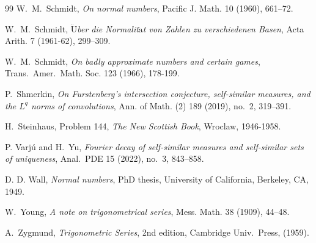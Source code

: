\documentclass[12pt, twoside]{article}
\theoremstyle{definition}
\numberwithin{equation}{section}
\begin{document}
\begin{thebibliography}{99}
W.~M.~Schmidt, 
{\em{On normal numbers}},
Pacific J. Math. 10 (1960), 661--72.

W.~M.~Schmidt, 
{\em{$\ddot{\text{U}}$ber die Normalit$\ddot{\text{a}}$t von Zahlen zu verschiedenen Basen}},
Acta Arith. 7 (1961-62), 299--309.

W.~M.~Schmidt,
{\em{On badly approximate numbers and certain games}}, Trans.~Amer.~Math. Soc. 123 (1966), 178-199. 

P.~Shmerkin,
{\em{On Furstenberg's intersection conjecture, self-similar measures, and the $L^q$ norms of convolutions}}, 
Ann. of Math. (2) 189 (2019), no.~2, 319--391.

H.~Steinhaus, Problem 144, 
{\em{The New Scottish Book}}, Wroclaw, 1946-1958.  

P. Varj\'u and H.~Yu, 
{\em{Fourier decay of self-similar measures and self-similar sets of uniqueness}}, 
Anal.~PDE 15 (2022), no.~3, 843--858.

D. D. Wall, 
{\em{Normal numbers}}, 
PhD thesis, University of California, Berkeley, CA, 1949. 

W.~Young, 
{\em{A note on trigonometrical series}}, 
Mess. Math. 38 (1909), 44--48. 


A.~Zygmund, 
{\em{Trigonometric Series}}, 2nd edition, 
Cambridge Univ.~Press, (1959).

\end{thebibliography}

\Addresses
\end{document}
